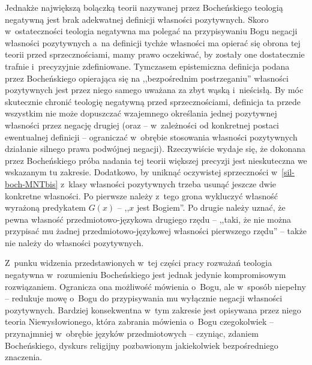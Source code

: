 Jednakże największą bolączką teorii nazywanej przez Bocheńskiego teologią negatywną jest brak adekwatnej definicji własności pozytywnych. Skoro w~ostateczności teologia negatywna ma polegać na przypisywaniu Bogu negacji własności pozytywnych a~na definicji tychże własności ma opierać się obrona tej teorii przed sprzecznościami, mamy prawo oczekiwać, by zostały one dostatecznie trafnie i~precyzyjnie zdefiniowane. Tymczasem epistemiczna definicja podana przez Bocheńskiego opierająca się na ,,bezpośrednim postrzeganiu'' własności pozytywnych jest przez niego samego uważana za zbyt wąską i~nieścisłą. By móc skutecznie chronić teologię negatywną przed sprzecznościami, definicja ta przede wszystkim nie może dopuszczać wzajemnego określania jednej pozytywnej własności przez negację drugiej (oraz -- w~zależności od konkretnej postaci ewentualnej definicji -- ograniczać w~obrębie stosowania własności pozytywnych działanie silnego prawa podwójnej negacji). Rzeczywiście wydaje się, że dokonana przez Bocheńskiego próba nadania tej teorii większej precyzji jest nieskuteczna we wskazanym tu zakresie. Dodatkowo, by uniknąć oczywistej sprzeczności w~\ref{sil-boch-MNTbis} z~klasy własności pozytywnych trzeba usunąć jeszcze dwie konkretne własności. Po pierwsze należy z~tego grona wykluczyć własność wyrażoną predykatem $G(x)$ -- ,,$x$ jest Bogiem''. Po drugie należy uznać, że pewna własność przedmiotowo-językowa drugiego rzędu -- ,,taki, że nie można przypisać mu żadnej przedmiotowo-językowej własności pierwszego rzędu'' -- także nie należy do własności pozytywnych.

Z~punku widzenia przedstawionych w~tej części pracy rozważań teologia negatywna w~rozumieniu Bocheńskiego jest jednak jedynie kompromisowym rozwiązaniem. Ogranicza ona możliwość mówienia o~Bogu, ale w~sposób niepełny -- redukuje mowę o~Bogu do przypisywania mu wyłącznie negacji własności pozytywnych. Bardziej konsekwentna w~tym zakresie jest opisywana przez niego teoria Niewysłowionego, która zabrania mówienia o~Bogu czegokolwiek -- przynajmniej w~obrębie języków przedmiotowych -- czyniąc, zdaniem Bocheńskiego, dyskurs religijny pozbawionym jakiekolwiek bezpośredniego znaczenia.

